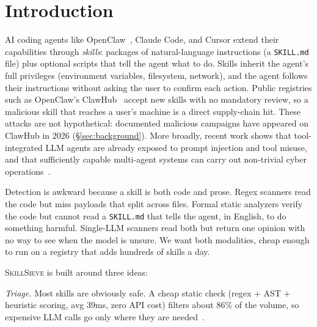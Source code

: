\documentclass[sigconf,nonacm]{acmart}
\begin{document}

\maketitle
\renewcommand{\shortauthors}{Hou, Yang, Pang, Ma}

\section{Introduction}
\label{sec:intro}

AI coding agents like OpenClaw~\cite{openclaw2026}, Claude Code, and Cursor extend their capabilities through \emph{skills}: packages of natural-language instructions (a \texttt{SKILL.md} file) plus optional scripts that tell the agent what to do. Skills inherit the agent's full privileges (environment variables, filesystem, network), and the agent follows their instructions without asking the user to confirm each action. Public registries such as OpenClaw's ClawHub~\cite{clawhub2026} accept new skills with no mandatory review, so a malicious skill that reaches a user's machine is a direct supply-chain hit. These attacks are not hypothetical: documented malicious campaigns have appeared on ClawHub in 2026 (\S\ref{sec:background}). More broadly, recent work shows that tool-integrated LLM agents are already exposed to prompt injection and tool misuse, and that sufficiently capable multi-agent systems can carry out non-trivial cyber operations~\cite{instructionhierarchy2024,injecagent2024,zdayagents2024}.

Detection is awkward because a skill is both code and prose. Regex scanners read the code but miss payloads that split across files. Formal static analyzers verify the code but cannot read a \texttt{SKILL.md} that tells the agent, in English, to do something harmful. Single-LLM scanners read both but return one opinion with no way to see when the model is unsure. We want both modalities, cheap enough to run on a registry that adds hundreds of skills a day.

\textsc{SkillSieve} is built around three ideas:

\emph{Triage.} Most skills are obviously safe. A cheap static check (regex + AST + heuristic scoring, avg 39ms, zero API cost) filters about 86\% of the volume, so expensive LLM calls go only where they are needed~\cite{frugalgpt2023}.
\end{document}

